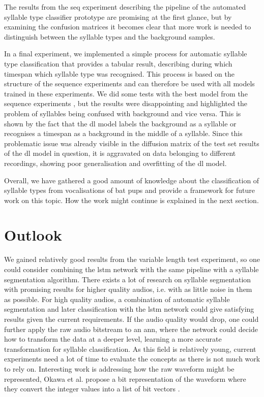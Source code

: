 
The results from the seq experiment describing the pipeline of the automated syllable type classifier prototype are promising at the first glance, but by examining the confusion matrices it becomes clear that more work is needed to distinguish between the syllable types and the background samples.

In a final experiment, we implemented a simple process for automatic syllable type classification that provides a tabular result, describing during which timespan which syllable type was recognised. This process is based on the structure of the sequence experiments and can therefore be used with all models trained in these experiments. We did some tests with the best model from the sequence experiments \cite{nn_densNet_scs_r3_p30s5l60_raw_100}, but the results were disappointing and highlighted the problem of syllables being confused with background and vice versa.
This is shown by the fact that the \gls{dl} model labels the background as a syllable or recognises a timespan as a background in the middle of a syllable.
Since this problematic issue was already visible in the diffusion matrix of the test set results of the \gls{dl} model in question, it is aggravated on data belonging to different recordings, showing poor generalisation and overfitting of the \gls{dl} model.

Overall, we have gathered a good amount of knowledge about the classification of syllable types from vocalisations of bat pups and provide a framework for future work on this topic. How the work might continue is explained in the next section.

\section{Outlook}
We gained relatively good results from the variable length test experiment, so one could consider combining the \gls{lstm} network with the same pipeline with a syllable segmentation algorithm.
There exists a lot of research on syllable segmentation with promising results for higher quality audios, i.e. with as little noise in them as possible.
For high quality audios, a combination of automatic syllable segmentation and later classification with the \gls{lstm} network could give satisfying results given the current requirements.
If the audio quality would drop, one could further apply the raw audio bitstream to an \gls{ann}, where the network could decide how to transform the data at a deeper level, learning a more accurate transformation for syllable classification.
As this field is relatively young, current experiments need a lot of time to evaluate the concepts as there is not much work to rely on.
Interesting work is addressing how the raw waveform might be represented, Okawa et al. propose a bit representation of the waveform where they convert the integer values into a list of bit vectors \cite{Okawa2019}.

